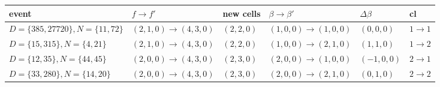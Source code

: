 \scriptsize\setlength{\tabcolsep}{3pt}\begin{tabular}{@{}llllll@{}}\toprule event & $f\to f'$ & new cells & $\beta\to\beta'$ & $\Delta\beta$ & cl\\\midrule
$D=\{385,27720\},N=\{11,72\}$ & $(2,1,0)\to(4,3,0)$ & $(2,2,0)$ & $(1,0,0)\to(1,0,0)$ & $(0,0,0)$ & $1\to1$\\
$D=\{15,315\},N=\{4,21\}$ & $(2,1,0)\to(4,3,0)$ & $(2,2,0)$ & $(1,0,0)\to(2,1,0)$ & $(1,1,0)$ & $1\to2$\\
$D=\{12,35\},N=\{44,45\}$ & $(2,0,0)\to(4,3,0)$ & $(2,3,0)$ & $(2,0,0)\to(1,0,0)$ & $(-1,0,0)$ & $2\to1$\\
$D=\{33,280\},N=\{14,20\}$ & $(2,0,0)\to(4,3,0)$ & $(2,3,0)$ & $(2,0,0)\to(2,1,0)$ & $(0,1,0)$ & $2\to2$\\
\bottomrule\end{tabular}
